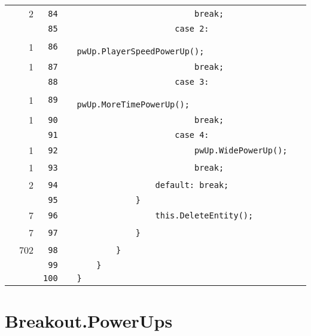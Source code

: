 \documentclass[a4paper,landscape,10pt]{article}
\begin{document}
\begin{longtable}[l]{lrrll}
\cellcolor{green} & 2 & \verb~84~ & & \verb~                        break;~\\
\cellcolor{gray} &  & \verb~85~ & & \verb~                    case 2:~\\
\cellcolor{green} & 1 & \verb~86~ & & \verb~                        pwUp.PlayerSpeedPowerUp();~\\
\cellcolor{green} & 1 & \verb~87~ & & \verb~                        break;~\\
\cellcolor{gray} &  & \verb~88~ & & \verb~                    case 3:~\\
\cellcolor{green} & 1 & \verb~89~ & & \verb~                        pwUp.MoreTimePowerUp();~\\
\cellcolor{green} & 1 & \verb~90~ & & \verb~                        break;~\\
\cellcolor{gray} &  & \verb~91~ & & \verb~                    case 4:~\\
\cellcolor{green} & 1 & \verb~92~ & & \verb~                        pwUp.WidePowerUp();~\\
\cellcolor{green} & 1 & \verb~93~ & & \verb~                        break;~\\
\cellcolor{green} & 2 & \verb~94~ & & \verb~                default: break;~\\
\cellcolor{gray} &  & \verb~95~ & & \verb~            }~\\
\cellcolor{green} & 7 & \verb~96~ & & \verb~                this.DeleteEntity();~\\
\cellcolor{green} & 7 & \verb~97~ & & \verb~            }~\\
\cellcolor{green} & 702 & \verb~98~ & & \verb~        }~\\
\cellcolor{gray} &  & \verb~99~ & & \verb~    }~\\
\cellcolor{gray} &  & \verb~100~ & & \verb~}~\\
\end{longtable}
\newpage
\section{Breakout.PowerUps}
\end{document}
